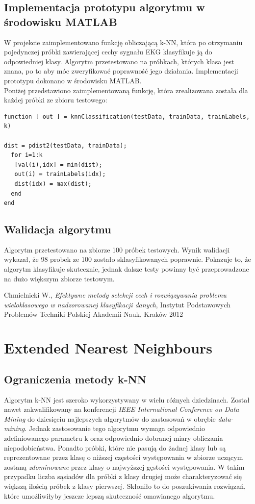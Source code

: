 \documentclass[[10pt,a4paper]{article}
\begin{document}
\subsection{Implementacja prototypu algorytmu w środowisku MATLAB}
W projekcie zaimplementowano funkcję obliczającą k-NN, która po otrzymaniu pojedynczej próbki zawierającej cechy sygnału EKG klasyfikuje ją do odpowiedniej klasy. Algorytm przetestowano na próbkach, których klasa jest znana, po to aby móc zweryfikować poprawność jego działania. Implementacji prototypu dokonano w środowisku MATLAB. \\

Poniżej przedstawiono zaimplementowaną funkcję, która zrealizowana została dla każdej próbki ze zbioru testowego:

\begin{lstlisting}
function [ out ] = knnClassification(testData, trainData, trainLabels, k)

dist = pdist2(testData, trainData);
  for i=1:k
   [val(i),idx] = min(dist);
   out(i) = trainLabels(idx);
   dist(idx) = max(dist);
  end
end
\end{lstlisting}

\subsection{Walidacja algorytmu}
Algorytm przetestowano na zbiorze 100 próbek testowych. Wynik walidacji wykazał, że 98 probek ze 100 zostało sklasyfikowanych poprawnie. Pokazuje to, że algorytm klasyfikuje skutecznie, jednak dalsze testy powinny być przeprowadzone na dużo większym zbiorze testowym.


\begin{thebibliography}{99}
 Chmielnicki W., \emph{Efektywne metody selekcji cech i rozwiązywania problemu wieloklasowego w nadzorowanej klasyfikacji danych}, Instytut Podstawowych Problemów Techniki Polskiej Akademii Nauk, Kraków 2012
\end{thebibliography}

\section{Extended Nearest Neighbours} 
\subsection{Ograniczenia metody k-NN ~\cite{knn}}
Algorytm k-NN jest szeroko wykorzystywany w wielu różnych dziedzinach. Został nawet zakwalifikowany na konferencji \emph{IEEE International Conference on Data Mining} do dziesięciu najlepszych algorytmów do zastosowań w obrębie \emph{data-mining}. Jednak zastosowanie tego algorytmu wymaga odpowiednio zdefiniowanego parametru k oraz odpowiednio dobranej miary obliczania niepodobieństwa. Ponadto próbki, które nie pasują do żadnej klasy lub są reprezentowane przez klasę o niższej częstości występowania w zbiorze uczącym zostaną \emph{zdominowane} przez klasy o najwyższej gęstości występowania. W takim przypadku liczba sąsiadów dla próbki z klasy drugiej może charakteryzować się większą ilością próbek z klasy pierwszej. Skłoniło to do poszukiwania rozwiązań, które umożliwiłyby jeszcze lepszą skuteczność omawianego algorytmu. 
\end{document}
